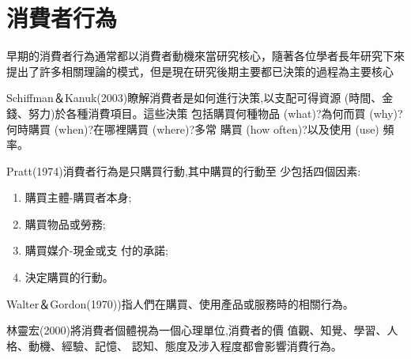 \section{消費者行為}
早期的消費者行為通常都以消費者動機來當研究核心，隨著各位學者長年研究下來提出了許多相關理論的模式，但是現在研究後期主要都已決策的過程為主要核心

Schiffman＆Kanuk(2003)\cite{Schiffman}瞭解消費者是如何進行決策,以支配可得資源 (時間、金錢、努力)於各種消費項目。這些決策 包括購買何種物品 (what)?為何而買 (why)? 何時購買 (when)?在哪裡購買 (where)?多常 購買 (how often)?以及使用 (use) 頻率。

Pratt(1974)\cite{Pratt1974}消費者行為是只購買行動,其中購買的行動至 少包括四個因素:
\begin{enumerate}
\item 購買主體-購買者本身; 
\item  購買物品或勞務;
\item  購買媒介-現金或支 付的承諾;
\item  決定購買的行動。
\end{enumerate}

Walter＆Gordon(1970)\cite{Walter1970})指人們在購買、使用產品或服務時的相關行為。


林靈宏(2000)將消費者個體視為一個心理單位,消費者的價 值觀、知覺、學習、人格、動機、經驗、記憶、 認知、態度及涉入程度都會影響消費行為。\cite{林靈宏}

